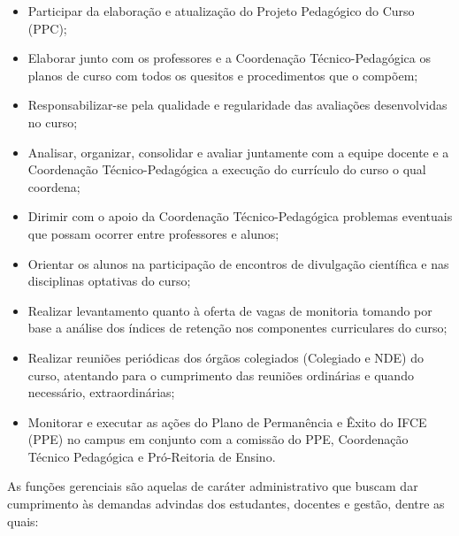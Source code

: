 \begin{itemize}
\item Participar da elaboração e atualização do Projeto Pedagógico do Curso (PPC);
\item Elaborar junto com os professores e a Coordenação Técnico-Pedagógica os planos de curso com todos os quesitos e procedimentos que o compõem;
\item Responsabilizar-se pela qualidade e regularidade das avaliações desenvolvidas no curso;
\item Analisar, organizar, consolidar e avaliar juntamente com a equipe docente e a Coordenação Técnico-Pedagógica a execução do currículo do curso o qual coordena;
\item Dirimir com o apoio da Coordenação Técnico-Pedagógica problemas eventuais que possam ocorrer entre professores e alunos;
\item Orientar os alunos na participação de encontros de divulgação científica e nas disciplinas optativas do curso;
\item Realizar levantamento quanto à oferta de vagas de monitoria tomando por base a análise dos índices de retenção nos componentes curriculares do curso;
\item Realizar reuniões periódicas dos órgãos colegiados (Colegiado e NDE) do curso, atentando para o cumprimento das reuniões ordinárias e quando necessário, extraordinárias;
\item Monitorar e executar as ações do Plano de Permanência e Êxito do IFCE (PPE) no campus em conjunto com a comissão do PPE, Coordenação Técnico Pedagógica e Pró-Reitoria de Ensino.

\end{itemize}

As funções gerenciais são aquelas de caráter administrativo que buscam dar cumprimento às demandas advindas dos estudantes, docentes e gestão, dentre as quais:

